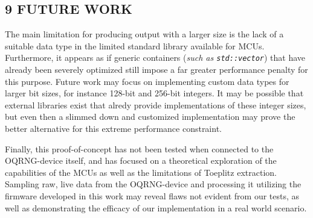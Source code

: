 \subsection{9 FUTURE WORK}\label{future-work}

The main limitation for producing output with a larger size is the lack of a suitable data type in the limited standard library available for MCUs. Furthermore, it appears as if generic containers (\emph{such as \texttt{std::vector}}) that have already been severely optimized still impose a far greater performance penalty for this purpose. Future work may focus on implementing custom data types for larger bit sizes, for instance 128-bit and 256-bit integers. It may be possible that external libraries exist that alredy provide implementations of these integer sizes, but even then a slimmed down and customized implementation may prove the better alternative for this extreme performance constraint.

Finally, this proof-of-concept has not been tested when connected to the OQRNG-device itself, and has focused on a theoretical exploration of the capabilities of the MCUs as well as the limitations of Toeplitz extraction. Sampling raw, live data from the OQRNG-device and processing it utilizing the firmware developed in this work may reveal flaws not evident from our tests, as well as demonstrating the efficacy of our implementation in a real world scenario.

